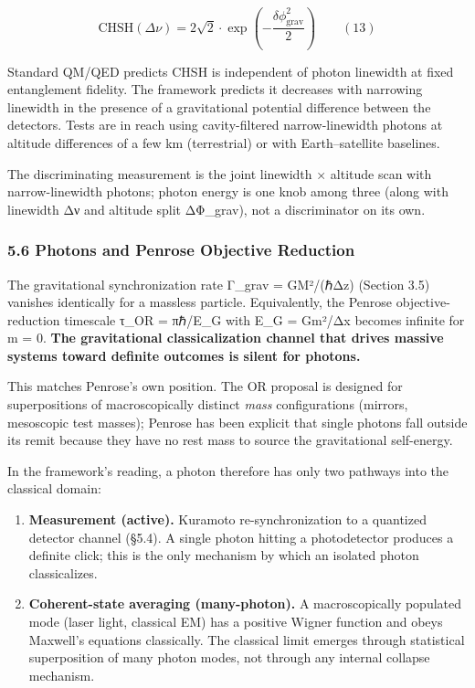 \documentclass[
]{article}
\providecommand{\tightlist}{%
  \setlength{\itemsep}{0pt}\setlength{\parskip}{0pt}}
\begin{document}
\[\text{CHSH}(\Delta\nu) = 2\sqrt{2} \cdot \exp\!\left(-\frac{\delta\phi_{\text{grav}}^2}{2}\right) \qquad (13)\]

Standard QM/QED predicts CHSH is independent of photon linewidth at
fixed entanglement fidelity. The framework predicts it decreases with
narrowing linewidth in the presence of a gravitational potential
difference between the detectors. Tests are in reach using
cavity-filtered narrow-linewidth photons at altitude differences of a
few km (terrestrial) or with Earth--satellite baselines.

The discriminating measurement is the joint linewidth × altitude scan
with narrow-linewidth photons; photon energy is one knob among three
(along with linewidth Δν and altitude split ΔΦ\_grav), not a
discriminator on its own.

\subsubsection{5.6 Photons and Penrose Objective
Reduction}\label{photons-and-penrose-objective-reduction}

The gravitational synchronization rate Γ\_grav = GM²/(ℏΔz) (Section 3.5)
vanishes identically for a massless particle. Equivalently, the Penrose
objective-reduction timescale τ\_OR = πℏ/E\_G with E\_G = Gm²/Δx becomes
infinite for m = 0. \textbf{The gravitational classicalization channel
that drives massive systems toward definite outcomes is silent for
photons.}

This matches Penrose's own position. The OR proposal is designed for
superpositions of macroscopically distinct \emph{mass} configurations
(mirrors, mesoscopic test masses); Penrose has been explicit that single
photons fall outside its remit because they have no rest mass to source
the gravitational self-energy.

In the framework's reading, a photon therefore has only two pathways
into the classical domain:

\begin{enumerate}
\def\labelenumi{\arabic{enumi}.}
\tightlist
\item
  \textbf{Measurement (active).} Kuramoto re-synchronization to a
  quantized detector channel (§5.4). A single photon hitting a
  photodetector produces a definite click; this is the only mechanism by
  which an isolated photon classicalizes.
\item
  \textbf{Coherent-state averaging (many-photon).} A macroscopically
  populated mode (laser light, classical EM) has a positive Wigner
  function and obeys Maxwell's equations classically. The classical
  limit emerges through statistical superposition of many photon modes,
  not through any internal collapse mechanism.
\end{enumerate}
\end{document}
